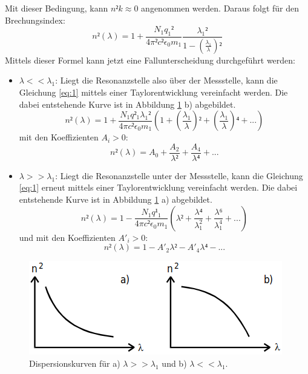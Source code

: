 Mit dieser Bedingung, kann $n²k \approx 0$ angenommen werden. Daraus folgt für den Brechungsindex:
\begin{equation}
  \label{eq:1}
  n²(\lambda)=1+ \frac{N_1 q_1²}{4\pi² c² \epsilon_0 m_1} \frac{\lambda_1²}{{1-\left(\frac{\lambda_1}{\lambda}\right)²}}
\end{equation}
Mittels dieser Formel kann jetzt eine Fallunterscheidung durchgeführt werden:
\begin{itemize}
  \item $\lambda << \lambda_1$: Liegt die Resonanzstelle also über der Messstelle, kann die Gleichung \eqref{eq:1} mittels einer Taylorentwicklung vereinfacht
  werden. Die dabei entstehende Kurve ist in Abbildung \ref{abb:2} b) abgebildet.
  \begin{equation*}
    n²(\lambda) = 1+\frac{N_1 q²_1 \lambda_1²}{4 \pi c² \epsilon_0 m_1} \left(1+\left(\frac{\lambda_1}{\lambda}\right)²+\left(\frac{\lambda_1}{\lambda}\right)⁴+ ...\right)
  \end{equation*}
  mit den Koeffizienten $A_i>0$:
  \begin{equation*}
    n²(\lambda) = A_0 + \frac{A_2}{\lambda²}+\frac{A_4}{\lambda⁴}+...
  \end{equation*}
  \item $\lambda >> \lambda_1$: Liegt die Resonanzstelle unter der Messstelle, kann die Gleichung \eqref{eq:1} erneut mittels einer Taylorentwicklung vereinfacht
  werden. Die dabei entstehende Kurve ist in Abbildung \ref{abb:2} a) abgebildet.
  \begin{equation*}
      n²(\lambda) = 1-\frac{N_1 q¹_1}{4 \pi c² \epsilon_0 m_1} \left(\lambda²+\frac{\lambda⁴}{\lambda_1^2}+\frac{\lambda⁶}{\lambda_1^4}+...\right)
  \end{equation*}
  und mit den Koeffizienten $A'_i>0$:
  \begin{equation*}
    n²(\lambda) = 1-A'_2\lambda²-A'_4\lambda⁴-...
  \end{equation*}
\end{itemize}
\FloatBarrier
\begin{figure}
  \centering
  \includegraphics[scale=0.6]{2.png}
  \caption{Dispersionskurven für a) $\lambda >> \lambda_1$ und b) $\lambda << \lambda_1$. \cite{Q1}}
  \label{abb:2}
\end{figure}
\FloatBarrier

